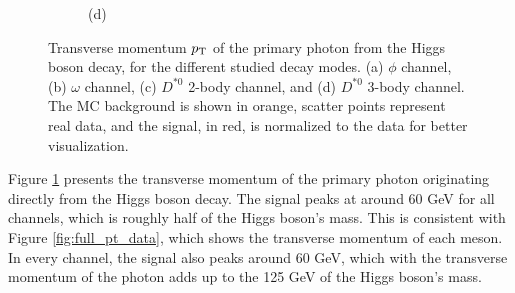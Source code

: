 \begin{figure}[!ht]
\begin{subfigure}[t]{0.50\mylength}
        \caption{\footnotesize (d)}
    \end{subfigure}%
\caption{Transverse momentum $p_\text{T}$ of the primary photon from the Higgs boson decay, for the different studied decay modes. (a) $\phi$ channel, (b) $\omega$ channel, (c) $D^{*0}$ 2-body channel, and (d) $D^{*0}$ 3-body channel. The MC background is shown in orange, scatter points represent real data, and the signal, in red, is normalized to the data for better visualization.}
\label{fig:photon_pt_data}
    \vspace*{-0.0cm}
\end{figure}

Figure \ref{fig:photon_pt_data} presents the transverse momentum of the primary photon originating directly from the Higgs boson decay. The signal peaks at around 60 GeV for all channels, which is roughly half of the Higgs boson's mass. This is consistent with Figure \ref{fig:full_pt_data}, which shows the transverse momentum of each meson. In every channel, the signal also peaks around 60 GeV, which with the transverse momentum of the photon adds up to the 125 GeV of the Higgs boson's mass.

